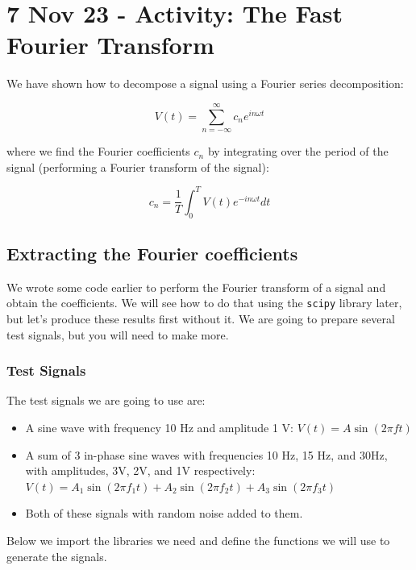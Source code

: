 \section{7 Nov 23 - Activity: The Fast Fourier
Transform}\label{nov-23---activity-the-fast-fourier-transform}

We have shown how to decompose a signal using a Fourier series
decomposition:

\[V(t) = \sum_{n=-\infty}^{\infty} c_n e^{i n \omega t}\]

where we find the Fourier coefficients \(c_n\) by integrating over the
period of the signal (performing a Fourier transform of the signal):

\[c_n = \frac{1}{T} \int_0^T V(t) e^{-i n \omega t} dt\]

\subsection{Extracting the Fourier
coefficients}\label{extracting-the-fourier-coefficients}

We wrote some code earlier to perform the Fourier transform of a signal
and obtain the coefficients. We will see how to do that using the
\texttt{scipy} library later, but let's produce these results first
without it. We are going to prepare several test signals, but you will
need to make more.

\subsubsection{Test Signals}\label{test-signals}

The test signals we are going to use are:

\begin{itemize}
\tightlist
\item
  A sine wave with frequency 10 Hz and amplitude 1 V:
  \(V(t) = A\sin(2 \pi f t)\)
\item
  A sum of 3 in-phase sine waves with frequencies 10 Hz, 15 Hz, and
  30Hz, with amplitudes, 3V, 2V, and 1V respectively:
  \(V(t) = A_1 \sin(2 \pi f_1 t) + A_2 \sin(2 \pi f_2 t) + A_3 \sin(2 \pi f_3 t)\)
\item
  Both of these signals with random noise added to them.
\end{itemize}

Below we import the libraries we need and define the functions we will
use to generate the signals.

\begin{Shaded}
\begin{Highlighting}[]
\end{Highlighting}
\end{Shaded}

